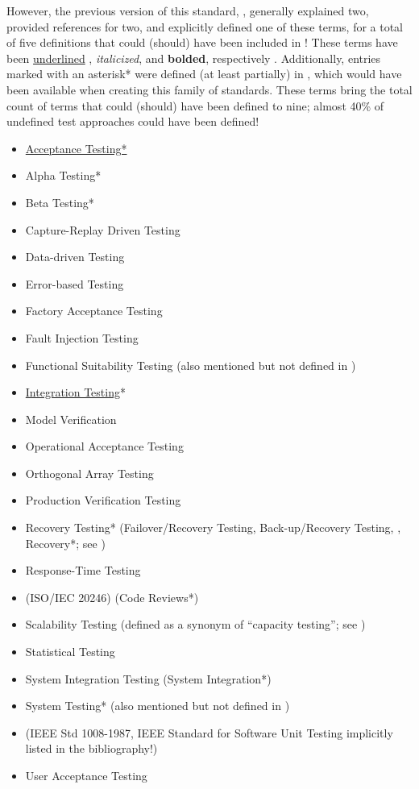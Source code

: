     However, the previous version of this standard, \citeyearpar{IEEE2013},
    generally explained two, provided references for two, and explicitly defined
    one of these terms, for a total of five definitions that could (should) have
    been included in \citeyearpar{IEEE2022}! These terms have been
    \underline{underlined}\ifnotpaper%
        , \emph{italicized}, and \textbf{bolded}, respectively%
    \fi. Additionally, entries marked with an asterisk* were defined (at least
    partially) in \citeyearpar{IEEE2017}, which would have been available when
    creating this family of standards. These terms bring the total count of terms
    that could (should) have been defined to nine; almost 40\% of undefined test
    approaches could have been defined!

    \begin{itemize}
        \item \underline{Acceptance Testing*}
        \item Alpha Testing*
        \item Beta Testing*
        \item Capture-Replay Driven Testing
        \item Data-driven Testing
        \item Error-based Testing
        \item Factory Acceptance Testing
        \item Fault Injection Testing
        \item Functional Suitability Testing (also mentioned but not defined in
              \citep{IEEE2017})
        \item \underline{Integration Testing}*
        \item Model Verification
        \item Operational Acceptance Testing
        \item Orthogonal Array Testing
        \item Production Verification Testing
        \item Recovery Testing* (Failover/Recovery Testing, Back-up/Recovery
              Testing, ,
              Recovery*; see )
        \item Response-Time Testing
        \item {} (ISO/IEC 20246) (Code Reviews*)
        \item Scalability Testing (defined as a synonym of ``capacity
              testing''; see )
        \item Statistical Testing
        \item System Integration Testing (System Integration*)
        \item System Testing* (also mentioned but not defined in \citep{IEEE2013})
        \item {}
              (IEEE Std 1008-1987, IEEE Standard for
              Software Unit Testing implicitly listed in the bibliography!)
        \item User Acceptance Testing
    \end{itemize}
\fi

